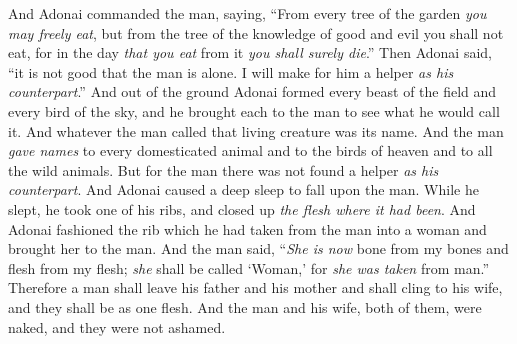 \begin{biblechapter}
\verse And Adonai commanded the man, saying, “From every tree of the garden \textit{you may freely eat},
\verse but from the tree of the knowledge of good and evil you shall not eat, for in the day \textit{that you eat} from it \textit{you shall surely die}.”
\verse Then Adonai said, “it is not good that the man is alone. I will make for him a helper \textit{as his counterpart}.”
\verse And out of the ground Adonai formed every beast of the field and every bird of the sky, and he brought each to the man to see what he would call it. And whatever the man called that living creature was its name.
\verse And the man \textit{gave names} to every domesticated animal and to the birds of heaven and to all the wild animals. But for the man there was not found a helper \textit{as his counterpart}.
\verse And Adonai caused a deep sleep to fall upon the man. While he slept, he took one of his ribs, and closed up \textit{the flesh where it had been}.
\verse And Adonai fashioned the rib which he had taken from the man into a woman and brought her to the man.
\verse And the man said, “\textit{She is now} bone from my bones 
and flesh from my flesh; 
\textit{she} shall be called ‘Woman,’ 
for \textit{she was taken} from man.”
\verse Therefore a man shall leave his father and his mother and shall cling to his wife, and they shall be as one flesh.
\verse And the man and his wife, both of them, were naked, and they were not ashamed.
\end{biblechapter}

